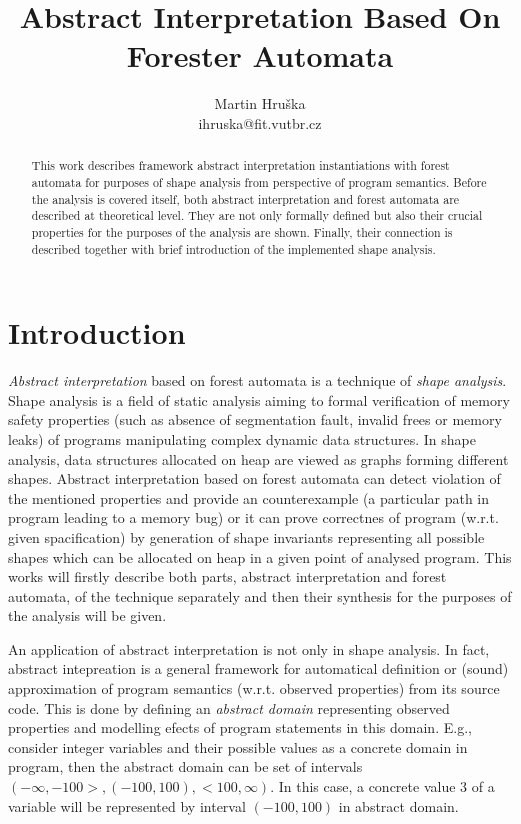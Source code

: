 \documentclass[a4paper, 12pt]{article}
\title{Abstract Interpretation Based On Forester Automata}
\author{Martin Hruška\\ihruska@fit.vutbr.cz}
\date{}
\begin{document}
\maketitle

\begin{abstract}
This work describes framework abstract interpretation instantiations
with forest automata for purposes of shape analysis from perspective
of program semantics.
Before the analysis is covered itself, both abstract interpretation
and forest automata are described at theoretical level.
They are not only formally defined but also their crucial properties
for the purposes of the analysis are shown.
Finally, their connection is described together with brief introduction
of the implemented shape analysis.
\end{abstract}

\tableofcontents

\section{Introduction}
\label{sec:intro}

\emph{Abstract interpretation} based on forest automata is a technique of \emph{shape analysis}.
Shape analysis is a field of static analysis aiming to
formal verification of memory safety properties (such as absence of
segmentation fault, invalid frees or memory leaks) of
programs manipulating complex dynamic data structures.
In shape analysis, data structures allocated on heap are viewed
as graphs forming different shapes.
Abstract interpretation based on forest automata can detect violation of the mentioned
properties and provide an counterexample (a particular path in program
leading to a memory bug) or it can prove correctnes of program (w.r.t. given spacification)
by generation of shape invariants representing all possible shapes which
can be allocated on heap in a given point of analysed program.
This works will firstly describe both parts, abstract interpretation and forest automata,
of the technique separately and then their
synthesis for the purposes of the analysis will be given.

An application of abstract interpretation is not only in shape analysis.
In fact, abstract intepreation is a general framework for automatical
definition or (sound) approximation of program semantics (w.r.t. observed properties) from its source code.
This is done by defining an \emph{abstract domain} representing observed properties
and modelling efects of program statements in this domain.
E.g., consider integer variables and their possible values as a concrete domain in program,
then the abstract domain can be set of intervals $(-\infty, -100>, (-100, 100), <100, \infty)$.
In this case, a concrete value $3$ of a variable will be represented by interval $(-100,100)$
in abstract domain.
\end{document}
